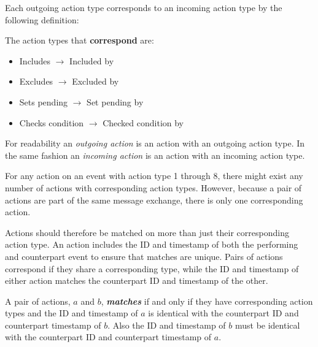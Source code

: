 	\noindent Each outgoing action type corresponds to an incoming action type by the following definition:
	
	\begin{definition}
		\label{def:happensbeforeaction}
		The action types that \textbf{correspond} are:
			\begin{itemize}
				\item Includes $\rightarrow$ Included by
				\item Excludes $\rightarrow$ Excluded by
				\item Sets pending $\rightarrow$ Set pending by
				\item Checks condition $\rightarrow$ Checked condition by
			\end{itemize}
	\end{definition}
	
	\noindent For readability an \textit{outgoing action} is an action with an outgoing action type. In the same fashion an \textit{incoming action} is an action with an incoming action type.
	
	\newpar For any action on an event with action type 1 through 8, there might exist any number of actions with corresponding action types. However, because a pair of actions are part of the same message exchange, there is only one corresponding action.
	
	Actions should therefore be matched on more than just their corresponding action type. An action includes the ID and timestamp of both the performing and counterpart event to ensure that matches are unique.
    Pairs of actions correspond if they share a corresponding type, while the ID and timestamp of either action matches the counterpart ID and timestamp of the other.
    
    \begin{definition}
    	\label{def:action:matching}
    	A pair of actions, $a$ and $b$, \textit{\textbf{matches}} if and only if they have corresponding action types and the ID and timestamp of $a$ is identical with the counterpart ID and counterpart timestamp of $b$. Also the ID and timestamp of $b$ must be identical with the counterpart ID and counterpart timestamp of $a$.
    \end{definition}
    
